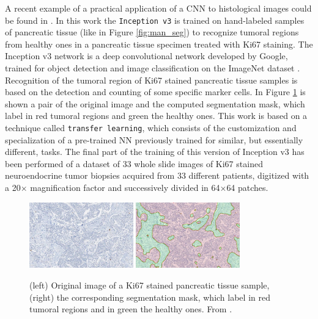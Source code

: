 A recent example of a practical application of a CNN to histological images could be found in \cite{Ki67}. In this work the \texttt{Inception v3} is trained on hand-labeled samples of pancreatic tissue (like in Figure \ref{fig:man_seg}) to recognize tumoral regions from healthy ones in a pancreatic tissue specimen treated with Ki67 staining. The Inception v3 \cite{ravindran2018classification} network is a deep convolutional network developed by Google, trained for object detection and image classification on the ImageNet dataset \cite{5206848}. Recognition of the tumoral region of Ki67 stained pancreatic tissue samples is based on the detection and counting of some specific marker cells. In Figure \ref{fig:autom_seg} is shown a pair of the original image and the computed segmentation mask, which label in red tumoral regions and green the healthy ones. This work is based on a technique called \texttt{transfer learning}, which consists of the customization and specialization of a pre-trained NN previously trained for similar, but essentially different, tasks. The final part of the training of this version of Inception v3 has been performed of a dataset of 33 whole slide images of Ki67 stained neuroendocrine tumor biopsies acquired from 33 different patients, digitized with a 20$\times$ magnification factor and successively divided in 64$\times$64 patches.

    \begin{figure}
        \centering
        \includegraphics[width = 0.4\textwidth]{images/PancTissue}
        \includegraphics[width = 0.4\textwidth]{images/PancTissueSeg}
        \caption{(left) Original image of a Ki67 stained pancreatic tissue sample, (right) the corresponding segmentation mask, which label in red tumoral regions and in green the healthy ones. From \cite{Ki67}.}
        \label{fig:autom_seg}
    \end{figure}

